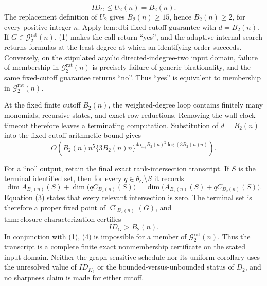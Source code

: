\[
 ID_G\leq U_2(n)=B_2(n).
 \tag{1}
\]
The replacement definition of \(U_2\) gives \(B_2(n)\geq15\), hence \(B_2(n)\geq2\), for every positive integer \(n\).  Apply \(\mathrm{lem:dbi\mbox{-}fixed\mbox{-}cutoff\mbox{-}guarantee}\) with \(d=B_2(n)\).  If \(G\in\mathcal G_{2}^{\mathrm{rat}}(n)\), (1) makes the call return ``yes'', and the adaptive internal search returns formulas at the least degree at which an identifying order succeeds.  Conversely, on the stipulated acyclic directed-indegree-two input domain, failure of membership in \(\mathcal G_{2}^{\mathrm{rat}}(n)\) is precisely failure of generic birationality, and the same fixed-cutoff guarantee returns ``no''.  Thus ``yes'' is equivalent to membership in \(\mathcal G_{2}^{\mathrm{rat}}(n)\).

At the fixed finite cutoff \(B_2(n)\), the weighted-degree loop contains finitely many monomials, recursive states, and exact row reductions.  Removing the wall-clock timeout therefore leaves a terminating computation.  Substitution of \(d=B_2(n)\) into the fixed-cutoff arithmetic bound gives
\[
 O\!\left(B_2(n)n^5\{3B_2(n)n\}^{4\alpha_{\mathrm{alg}}B_2(n)^2\log(3B_2(n)n)}\right).
 \tag{2}
\]

For a ``no'' output, retain the final exact rank-intersection transcript.  If \(S\) is the terminal identified set, then for every \(q\in\theta_G\setminus S\) it records
\[
 \dim A_{B_2(n)}(S)
 +\dim\bigl(qC_{B_2(n)}(S)\bigr)
 =\dim\bigl(A_{B_2(n)}(S)+qC_{B_2(n)}(S)\bigr).
 \tag{3}
\]
Equation (3) states that every relevant intersection is zero.  The terminal set is therefore a proper fixed point of \(\operatorname{Cl}_{B_2(n)}(G)\), and \(\mathrm{thm:closure\mbox{-}characterization}\) certifies
\[
 ID_G>B_2(n).
 \tag{4}
\]
In conjunction with (1), (4) is impossible for a member of \(\mathcal G_{2}^{\mathrm{rat}}(n)\).  Thus the transcript is a complete finite exact nonmembership certificate on the stated input domain.  Neither the graph-sensitive schedule nor its uniform corollary uses the unresolved value of \(ID_{K_6}\) or the bounded-versus-unbounded status of \(D_2\), and no sharpness claim is made for either cutoff.
